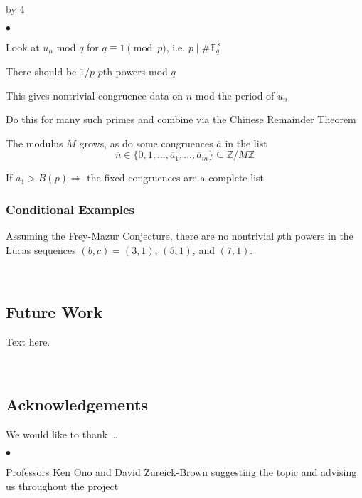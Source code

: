 \documentclass[12pt]{scrartcl}
\newenvironment{citemize}{
\begin{list}{$\bullet$}{\setlength{\itemsep}{0pt} \setlength{\rightmargin}{0pt} \setlength{\leftmargin}{0.5\labelwidth} \setlength{\topsep}{0pt}}
}{\end{list}}
\def\F{{\mathbb F}}
\def\Z{{\mathbb Z}}
\renewcommand{\bar}{\overline}
\def\anzspalten{4}
\newlength{\kastenwidth}
\newenvironment{kasten}{%
  \begin{lrbox}{\dummybox}%
    \begin{minipage}{0.96\linewidth}}%
    {\end{minipage}%
  \end{lrbox}%
  \raisebox{-\depth}{\psshadowbox[framesep=1em]{\usebox{\dummybox}}}\\[0.5em]}
\newenvironment{spalte}{%
  \setlength\kastenwidth{1.2\textwidth}
  \divide\kastenwidth by \anzspalten
  \begin{minipage}[t]{\kastenwidth}}{\end{minipage}\hfill}
\begin{document}
\begin{lrbox}{\spalten}
{\begin{spalte}
\begin{kasten}
\begin{citemize}
\item Look at $u_n$ mod $q$ for $q \equiv 1 \pmod{p}$, i.e. $p \mid \#\F_q^\times$

\item There should be $1/p$ $p$th powers mod $q$



\item This gives nontrivial congruence data on $n$ mod the period of $u_n$



\item Do this for many such primes and combine via the Chinese Remainder Theorem


\item The modulus $M$ grows, as do some congruences $\bar{a}$ in the list
\[ \bar{n} \in \{0,1,...,\bar{a}_1,...,\bar{a}_m\} \subseteq \Z/M\Z \]


\item If $\bar{a}_1 > B(p) \Rightarrow $ the fixed congruences are a complete list

\end{citemize}

\subsubsection*{\color{red} Conditional Examples}

Assuming the Frey-Mazur Conjecture, there are no nontrivial $p$th powers in the Lucas sequences $(b,c) = (3,1)$, $(5,1)$, and $(7,1)$.

\end{kasten}

\begin{kasten}
\subsection*{{\color{blue} \large Future Work}}
Text here.
\end{kasten}

\begin{kasten}
\subsection*{{\color{blue} Acknowledgements}}
We would like to thank \ldots
\begin{citemize}
\item Professors Ken Ono and David Zureick-Brown suggesting the topic and advising us throughout the project


\end{citemize}
\end{kasten}
\end{spalte}}
\end{lrbox}
\end{document}
